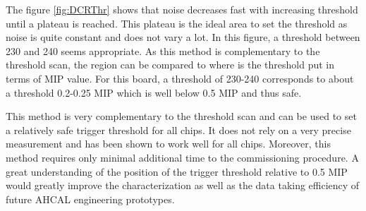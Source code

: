 The figure \ref{fig:DCRThr} shows that noise decreases fast with increasing threshold until a plateau is reached. This plateau is the ideal area to set the threshold as noise is quite constant and does not vary a lot. In this figure, a threshold between 230 and 240 seems appropriate. As this method is complementary to the threshold scan, the region can be compared to where is the threshold put in terms of MIP value. For this board, a threshold of 230-240 corresponds to about a threshold 0.2-0.25 MIP which is well below 0.5 MIP and thus safe.

This method is very complementary to the threshold scan and can be used to set a relatively safe trigger threshold for all chips. It does not rely on a very precise measurement and has been shown to work well for all chips. Moreover, this method requires only minimal additional time to the commissioning procedure. A great understanding of the position of the trigger threshold relative to 0.5 MIP would greatly improve the characterization as well as the data taking efficiency of future AHCAL engineering prototypes.
